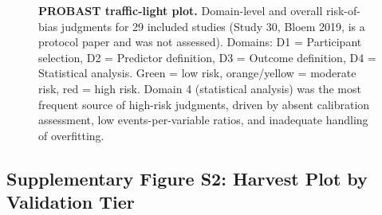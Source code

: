 \documentclass[11pt,a4paper]{article}
\begin{document}
\begin{figure}[H]
\caption{\textbf{PROBAST traffic-light plot.} Domain-level and overall risk-of-bias judgments for 29 included studies (Study 30, Bloem 2019, is a protocol paper and was not assessed). Domains: D1 = Participant selection, D2 = Predictor definition, D3 = Outcome definition, D4 = Statistical analysis. Green = low risk, orange/yellow = moderate risk, red = high risk. Domain 4 (statistical analysis) was the most frequent source of high-risk judgments, driven by absent calibration assessment, low events-per-variable ratios, and inadequate handling of overfitting.}
\label{fig:s1_probast}
\end{figure}

\clearpage
\subsection*{Supplementary Figure S2: Harvest Plot by Validation Tier}
\end{document}
